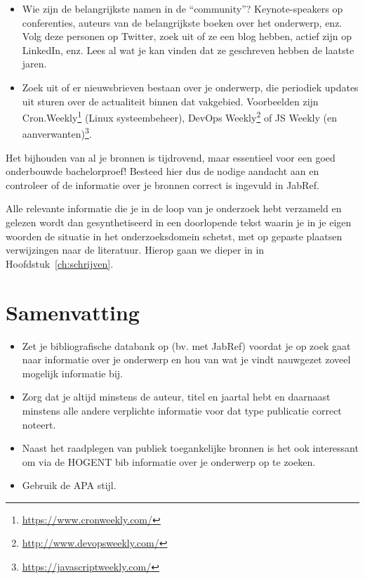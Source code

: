 \begin{itemize}
  \item Wie zijn de belangrijkste namen in de ``community''? Keynote-speakers op conferenties, auteurs van de belangrijkste boeken over het onderwerp, enz. Volg deze personen op Twitter, zoek uit of ze een blog hebben, actief zijn op LinkedIn, enz. Lees al wat je kan vinden dat ze geschreven hebben de laatste jaren.
  
  \item Zoek uit of er nieuwsbrieven bestaan over je onderwerp, die periodiek updates uit sturen over de actualiteit binnen dat vakgebied. Voorbeelden zijn Cron.Weekly\footnote{\url{https://www.cronweekly.com/}} (Linux systeembeheer), DevOps Weekly\footnote{\url{http://www.devopsweekly.com/}} of JS Weekly (en aanverwanten)\footnote{\url{https://javascriptweekly.com/}}.
\end{itemize}

Het bijhouden van al je bronnen is tijdrovend, maar essentieel voor een goed onderbouwde bachelorproef! Besteed hier dus de nodige aandacht aan en controleer of de informatie over je bronnen correct is ingevuld in JabRef.

Alle relevante informatie die je in de loop van je onderzoek hebt verzameld en gelezen wordt dan gesynthetiseerd in een doorlopende tekst waarin je in je eigen woorden de situatie in het onderzoeksdomein schetst, met op gepaste plaatsen verwijzingen naar de literatuur. Hierop gaan we dieper in in Hoofdstuk~\ref{ch:schrijven}.

\section{Samenvatting}
\label{sec:bibliografie-samenvatting}

\begin{itemize}
  \item Zet je bibliografische databank op (bv. met JabRef) voordat je op zoek gaat naar informatie over je onderwerp en hou van wat je vindt nauwgezet zoveel mogelijk informatie bij.
  \item Zorg dat je altijd minstens de auteur, titel en jaartal hebt en daarnaast minstens alle andere verplichte informatie voor dat type publicatie correct noteert.
  \item Naast het raadplegen van publiek toegankelijke bronnen is het ook interessant om via de HOGENT bib informatie over je onderwerp op te zoeken.
  \item Gebruik de APA stijl.
\end{itemize}
